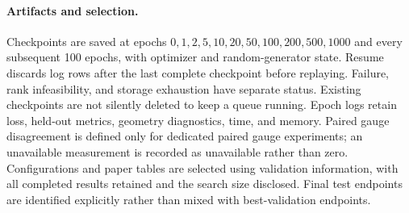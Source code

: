 \paragraph{Artifacts and selection.} Checkpoints are saved at epochs $0,1,2,5,10,20,50,100,200,500,1000$ and every subsequent 100 epochs, with optimizer and random-generator state. Resume discards log rows after the last complete checkpoint before replaying. Failure, rank infeasibility, and storage exhaustion have separate status. Existing checkpoints are not silently deleted to keep a queue running. Epoch logs retain loss, held-out metrics, geometry diagnostics, time, and memory. Paired gauge disagreement is defined only for dedicated paired gauge experiments; an unavailable measurement is recorded as unavailable rather than zero. Configurations and paper tables are selected using validation information, with all completed results retained and the search size disclosed. Final test endpoints are identified explicitly rather than mixed with best-validation endpoints.
